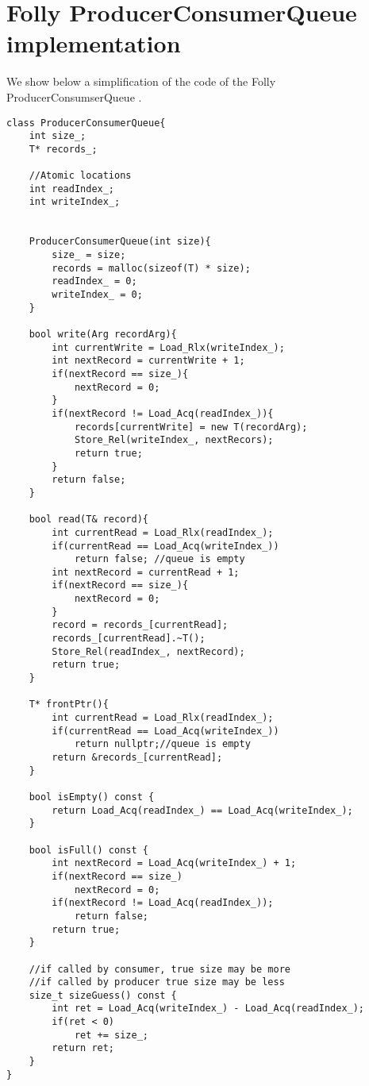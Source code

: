 \chapter{Folly ProducerConsumerQueue implementation}
\label{app:queue}
 We show below a simplification of the code of the Folly ProducerConsumserQueue \cite{queue}.

 \begin{lstlisting}
class ProducerConsumerQueue{
	int size_;
	T* records_;

	//Atomic locations
	int readIndex_;
	int writeIndex_;

	
	ProducerConsumerQueue(int size){
		size_ = size;
		records = malloc(sizeof(T) * size);
		readIndex_ = 0;
		writeIndex_ = 0;
	}	

	bool write(Arg recordArg){
		int currentWrite = Load_Rlx(writeIndex_);
		int nextRecord = currentWrite + 1;
		if(nextRecord == size_){
			nextRecord = 0;
		}
		if(nextRecord != Load_Acq(readIndex_)){
			records[currentWrite] = new T(recordArg);
			Store_Rel(writeIndex_, nextRecors);
			return true;
		}
		return false;
	}

	bool read(T& record){
		int currentRead = Load_Rlx(readIndex_);
		if(currentRead == Load_Acq(writeIndex_))
			return false; //queue is empty
		int nextRecord = currentRead + 1;
		if(nextRecord == size_){
			nextRecord = 0;
		}
		record = records_[currentRead];
		records_[currentRead].~T();
		Store_Rel(readIndex_, nextRecord);
		return true;
	}

	T* frontPtr(){
		int currentRead = Load_Rlx(readIndex_);
		if(currentRead == Load_Acq(writeIndex_))
			return nullptr;//queue is empty
		return &records_[currentRead];
	}
	
	bool isEmpty() const {
		return Load_Acq(readIndex_) == Load_Acq(writeIndex_);
	}

	bool isFull() const {
		int nextRecord = Load_Acq(writeIndex_) + 1;
		if(nextRecord == size_)
			nextRecord = 0;
		if(nextRecord != Load_Acq(readIndex_));
			return false;
		return true;
	}

	//if called by consumer, true size may be more
	//if called by producer true size may be less
	size_t sizeGuess() const {
		int ret = Load_Acq(writeIndex_) - Load_Acq(readIndex_);
		if(ret < 0)
			ret += size_;
		return ret;
	}
}
 \end{lstlisting}
